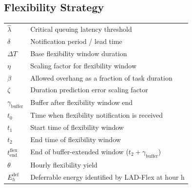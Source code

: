 \documentclass[preprint,12pt]{elsarticle}
\providecommand{\DIFaddbegin}{} %
\providecommand{\DIFdelbegin}{} %
\providecommand{\DIFdelend}{} %
\providecommand{\DIFscaledelfig}{0.5}
\newlength{\DIFdelgraphicswidth} %
\newlength{\DIFdelgraphicsheight} %
\providecommand{\DIFaddincludegraphics}[2][]{{\color{blue}\fbox{\DIFOincludegraphics[#1]{#2}}}} %
\providecommand{\DIFdelincludegraphics}[2][]{%
\sbox{\DIFdelgraphicsbox}{\DIFOincludegraphics[#1]{#2}}%
\settoboxwidth{\DIFdelgraphicswidth}{\DIFdelgraphicsbox} %
\settoboxtotalheight{\DIFdelgraphicsheight}{\DIFdelgraphicsbox} %
\scalebox{\DIFscaledelfig}{%
\parbox[b]{\DIFdelgraphicswidth}{\usebox{\DIFdelgraphicsbox}\\[-\baselineskip] \rule{\DIFdelgraphicswidth}{0em}}\llap{\resizebox{\DIFdelgraphicswidth}{\DIFdelgraphicsheight}{%
\setlength{\unitlength}{\DIFdelgraphicswidth}%
\begin{picture}(1,1)%
\thicklines\linethickness{2pt} %
{\color[rgb]{1,0,0}\put(0,0){\framebox(1,1){}}}%
{\color[rgb]{1,0,0}\put(0,0){\line( 1,1){1}}}%
{\color[rgb]{1,0,0}\put(0,1){\line(1,-1){1}}}%
\end{picture}%
}\hspace*{3pt}}} %
} %
\DeclareRobustCommand{\DIFaddbegin}{\DIFOaddbegin \let\includegraphics\DIFaddincludegraphics} %
\DeclareRobustCommand{\DIFdelbegin}{\DIFOdelbegin \let\includegraphics\DIFdelincludegraphics} %
\DeclareRobustCommand{\DIFdelend}{\DIFOaddend \let\includegraphics\DIFOincludegraphics} %
\begin{document}
\subsection*{Flexibility Strategy}
\DIFdelbegin %
\DIFdelend \DIFaddbegin \begin{tabular}{ll}
$\hat{\lambda}$ & Critical queuing latency threshold \\
$\delta$ & Notification period / lead time \\
$\Delta T$ & Base flexibility window duration \\
$\eta$ & Scaling factor for flexibility window \\
$\beta$ & Allowed overhang as a fraction of task duration \\
$\zeta$ & Duration prediction error scaling factor \\
$\gamma_{\text{buffer}}$ & Buffer after flexibility window end \\
$t_0$ & Time when flexibility notification is received \\
$t_1$ & Start time of flexibility window \\
$t_2$ & End time of flexibility window \\
$t_{\text{end}}^{\text{flex}}$ & End of buffer-extended window ($t_2 + \gamma_{\text{buffer}}$) \\
$\theta$ & Hourly flexibility yield \\
$E_h^{\text{def}}$ & Deferrable energy identified by LAD-Flex at hour h \\
\end{tabular}
\end{document}

